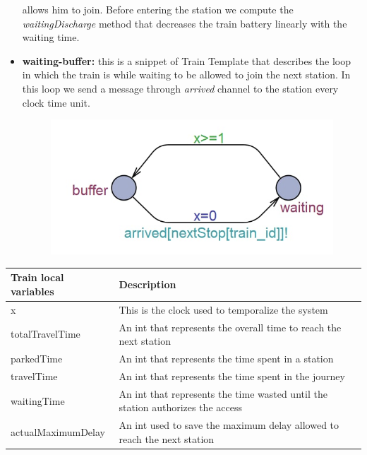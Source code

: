 \begin{itemize}
            allows him to join. Before entering the station we compute the \textit{waitingDischarge} method that decreases
            the train battery linearly with the waiting time.
    \item \textbf{waiting-buffer: }this is a snippet of Train Template that describes the loop in which the train is while
            waiting to be allowed to join the next station. In this loop we send a message through \emph{arrived} channel
            to the station every clock time unit.
            \begin{figure}[H]
                \centering
                \includegraphics[scale=0.56]{images/bufferSnippet.png}
            \end{figure}
\end{itemize}

\newpage

\begin{table} [H]
    \begin{tabu} to \textwidth {|X|X[3.5]|}
    \hline
    \textbf{Train local variables}              & \textbf{Description} \\  \hline
    x                       & This is the clock used to temporalize the system \\  \hline
    totalTravelTime         & An int that represents the overall time to reach the next station \\    \hline
    parkedTime              & An int that represents the time spent in a station \\    \hline
    travelTime              & An int that represents the time spent in the journey \\  \hline
    waitingTime             & An int that represents the time wasted until the station authorizes the access \\  \hline
    actualMaximumDelay      & An int used to save the maximum delay allowed to reach the next station \\    \hline
    \end{tabu}
\end{table}

\newpage

